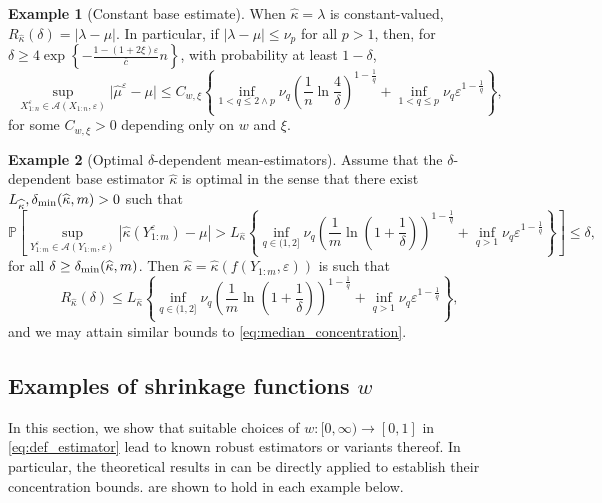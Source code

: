 \documentclass{article}
\theoremstyle{plain}
\theoremstyle{definition}
\newtheorem{example}{Example}
\def\eps{\varepsilon}
\renewcommand{\Pr}{\mathbb{P}}
\def\sA{\mathcal{A}}
\begin{document}
\begin{example}[Constant base estimate]\label{ex:constant_base_estimate}
  When \( \widehat{\kappa }=\lambda \) is constant-valued, \( R_{\widehat{\kappa  } }(\delta )=\lvert \lambda -\mu  \rvert  \). In particular, if \( \lvert \lambda - \mu  \rvert \le \nu _p  \) for all \( p>1 \), then, for \( \delta \ge 4\exp \left\{-\frac{1-(1+2\xi )\varepsilon }{\overline{c}}n\right\} \), with probability at least \( 1-\delta  \), \[
 \sup_{X_{1:n}^\varepsilon \in \sA(X_{1:n},\varepsilon )}   \lvert \widehat{\mu }^\varepsilon -\mu   \rvert  \le C_{w,\xi } \left\{ \inf_{1<q\le 2\wedge p} \nu _q\left(\frac{1}{n} \ln \frac{4}{\delta }\right)^{1-\frac{1}{q}}+ \inf_{1<q \le p} \nu_q \varepsilon^{1-\frac{1}{q}}\right\},
  \]
  for some \( C_{w,\xi}>0 \) depending only on \( w \) and \( \xi  \). 
\end{example}

\begin{example}[Optimal \( \delta  \)-dependent mean-estimators]\label{ex:optimal_base_estimator}
  Assume that the \( \delta  \)-dependent base estimator \( \widehat{\kappa} \) is optimal in the sense that there exist \( L_{\widehat{\kappa } }, \delta_{\textup{min}}(\widehat{\kappa },m)>0 \) such that 
\[
  \Pr\left[ \sup_{Y_{1:m}^\varepsilon \in \sA(Y_{1:m},\varepsilon )}|\widehat{\kappa }(Y_{1:m}^\varepsilon )  -\mu |  > L_{\widehat{\kappa } }\left\{ \inf_{q\in (1,2]}\nu_q \left(\frac{1}{m}\ln\left(1+\frac{1}{\delta}\right)\right)^{1-\frac{1}{q}}+\inf_{q>1}\nu_q\eps^{1-\frac{1}{q}}\right\} \right] \leq \delta,
\] 
for all \( \delta \ge \delta_{\textup{min}}(\widehat{\kappa },m ) \). Then \( \widehat{\kappa }=\widehat{\kappa }(f(Y_{1:m},\varepsilon ))   \) is such that
\[
  R_{\widehat{\kappa } }(\delta ) \le L_{\widehat{\kappa } }\left\{ \inf_{q\in (1,2]}\nu_q \left(\frac{1}{m}\ln\left(1+\frac{1}{\delta}\right)\right)^{1-\frac{1}{q}}+\inf_{q>1}\nu_q\eps^{1-\frac{1}{q}}\right\},\]
  and we may attain similar bounds to \eqref{eq:median_concentration}. 
\end{example}
\subsection{Examples of shrinkage functions \( w \)}\label{sec:examples}
In this section, we show that suitable choices of $w : [0,\infty) \to [0,1]$ in \eqref{eq:def_estimator} lead to known robust estimators or variants thereof. In particular, the theoretical results in  can be directly applied to establish their concentration bounds.  are shown to hold in each example below.
\end{document}
